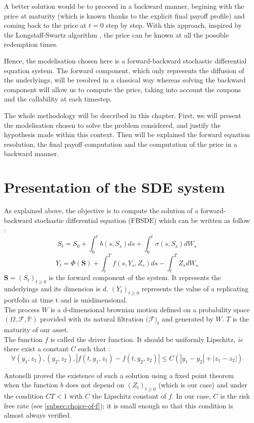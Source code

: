 \documentclass[a4paper,11pt,english]{book}
\begin{document}
A better solution would be to proceed in a backward manner, begining with the price at maturity (which is known thanks to the explicit final payoff profile) and coming back to the price at $t=0$ step by step. With this approach, inspired by the Longstaff-Swartz algorithm \cite{schwartz2001valuing}, the price can be known at all the possible redemption times.

Hence, the modelisation chosen here is a forward-backward stochastic differential equation system. The forward component, which only represents the diffusion of the underlyings, will be resolved in a classical way whereas solving the backward component will allow us to compute the price, taking into account the coupons and the callability at each timestep.

The whole methodology will be described in this chapter. First, we will present the modelisation chosen to solve the problem considered, and justify the hypothesis made within this context. Then will be explained the forward equation resolution, the final payoff computation and the computation of the price in a backward manner.


\section{Presentation of the SDE system}
\label{sec:SDE-presentation}
As explained above, the objective is to compute the solution of  a forward-backward stochastic differential equation (FBSDE) which can be written as follow :
$$S_{t} = S_{0}+\int_{0}^{t}b(s,S_{s})ds +\int_{0}^{t} \sigma(s,S_{s})dW_{s}$$
$$Y_{t} = \Phi(\textbf{S}) + \int_{t}^{T}f(s,Y_{s},Z_{s})ds -\int_{t}^{T}Z_{s}dW_{s}$$
$\textbf{S}=(S_{t})_{t\geq0}$ is the forward component of the system. It represents the underlyings and its dimension is $d$. $(Y_{t})_{t\geq0}$ represents the value of a replicating portfolio at time t and is unidimensional.\\
The process $W$ is a d-dimensional brownian motion defined on a probability space $(\Omega,\mathcal{F},\mathbb{P})$ provided with its natural filtration $(\mathcal{F)}_{t}$ and generated by $W$. 
$T$ is the maturity of our asset.\\

The function $f$ is called the driver function. It should be uniformly Lipschitz, \textit{ie} there exist a constant $C$ such that :
$$\forall (y_{1},z_{1}),(y_{2},z_{2}), |f(t,y_{1},z_{1})-f(t,y_{2},z_{2})|\leq C(|y_{1}-y_{2}|+|z_{1}-z_{2}|)$$

Antonelli \cite{antonelli1993backward} proved the existence of such a solution using a fixed point theorem when the function $b$ does not depend on $(Z_{t})_{t\geq0}$ (which is our case) and under the condition $CT<1$ with $C$ the Lipschitz constant of $f$. In our case, $C$ is the risk free rate (see \ref{subsec:choice-of-f}); it is small enough so that this condition is almost always verified.\\
\end{document}
